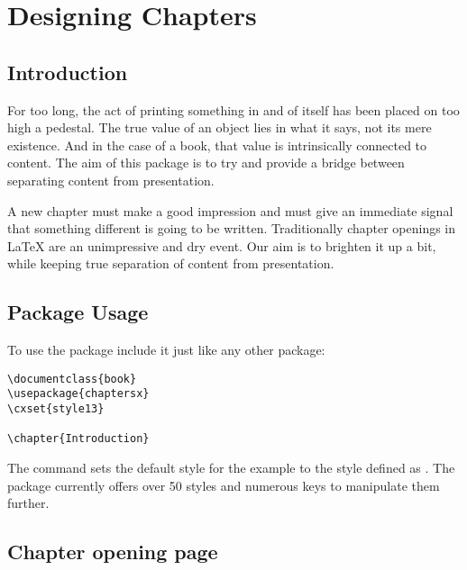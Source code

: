 \chapter{Designing Chapters}

\section{Introduction}

For too long, the act of printing something in and of itself has been placed on too high a pedestal. The true value of an object lies in what it says, not its mere existence. And in the case of a book, that value is intrinsically connected to content. The aim of this package is to try and provide a bridge between separating content from presentation.

A new chapter must make a good impression and must give an immediate signal that something different is going to be written. Traditionally chapter openings in LaTeX are an unimpressive and dry event. Our aim is to brighten it up a bit, while keeping true separation of content from presentation.



\section{Package Usage}

To use the package include it just like any other package:

\begin{tcolorbox}
\begin{lstlisting}
\documentclass{book}
\usepackage{chaptersx}
\cxset{style13}

\chapter{Introduction}

\end{lstlisting}
\end{tcolorbox}

The command  sets the default style for the example to the style defined as . The package currently offers over 50 styles and numerous keys to manipulate them further.



\section{Chapter opening page}

